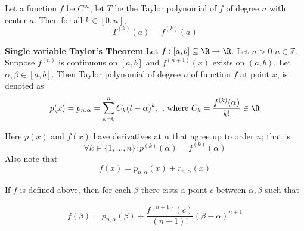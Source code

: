 \documentclass[11pt]{article}
\begin{document}
\begin{theorem*}
  Let a function $f$ be $C^{\infty}$, let $T$ be the Taylor polynomial of $f$ of degree $n$ with center $a$. Then for all $k\in [0, n]$,
  \[
    T^{(k)}(a) = f^{(k)}(a)
  \]
\end{theorem*}


\begin{defn*}
  \label{One-Var Taylor Series} \textbf{Single variable Taylor's Theorem} Let $f: [a,b]\subseteq \R \rightarrow \R$. Let $n>0$ $n\in \mathbb{Z}$. Suppose $f^{(n)}$ is continuous on $[a,b]$ and $f^{(n+1)}(x)$ exists on $(a,b)$. Let $\alpha, \beta \in [a,b]$. Then Taylor polynomial of degree $n$ of function $f$ at point $x$, is denoted as
  \[
    p(x) = p_{n, \alpha} = \sum_{k=0}^{n} C_k (t-\alpha)^k, \text{ , where } C_k = \frac{f^{(k)}(\alpha)}{k!} \in\R
  \]
  \begin{rem}
    Here $p(x)$ and $f(x)$ have derivatives at $\alpha$ that agree up to order $n$; that is
    \[
      \forall k\in \{1,\dots, n\}: p^{(k)}(\alpha) = f^{(k)}(\alpha)
    \]
    Also note that
    \[
      f(x) = p_{n, \alpha}(x) + r_{n, \alpha} (x)
    \]
  \end{rem}
  \noindent If $f$ is defined above, then for each $\beta$ there eists a point $c$ between $\alpha,\beta$ such that

   \[
    f(\beta) = p_{n, \alpha}(\beta) + \frac{f^{(n+1)}(c)}{(n+1)!} (\beta - \alpha)^{n+1}
   \]

  \begin{figure}[h!]
    \centering
  \end{figure}

\end{defn*}
\end{document}
